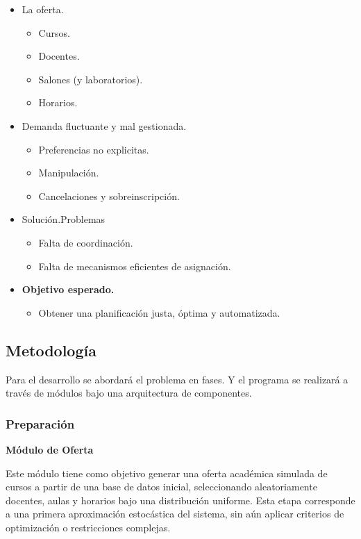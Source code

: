 \documentclass{article}
\begin{document}
\begin{itemize}
  \item La oferta.
        \begin{itemize}
          \item Cursos.
          \item Docentes.
          \item Salones (y laboratorios).
          \item Horarios.
        \end{itemize}
  \item Demanda fluctuante y mal gestionada.
        \begin{itemize}
          \item Preferencias no explicitas.
          \item Manipulación.
          \item Cancelaciones y sobreinscripción.
        \end{itemize}
  \item Solución.Problemas
        \begin{itemize}
          \item Falta de coordinación.
          \item Falta de mecanismos eficientes de asignación.
        \end{itemize}
  \item \textbf{Objetivo esperado.}
        \begin{itemize}
          \item Obtener una planificación justa, óptima y automatizada.
        \end{itemize}
\end{itemize}

\subsection{Metodología}

Para el desarrollo se abordará el problema en fases. Y el programa se realizará a través de módulos
bajo una arquitectura de componentes.

\subsubsection{Preparación}

\textbf{Módulo de Oferta}

Este módulo tiene como objetivo generar una oferta académica simulada de cursos a partir de una base 
de datos inicial, seleccionando aleatoriamente docentes, aulas y horarios bajo una distribución 
uniforme. Esta etapa corresponde a una primera aproximación estocástica del sistema, sin aún aplicar 
criterios de optimización o restricciones complejas.\\
\end{document}
